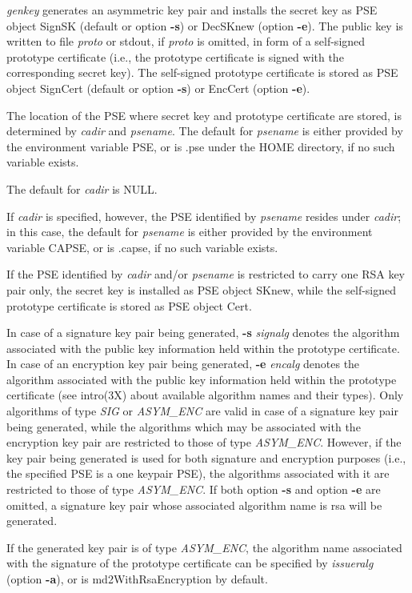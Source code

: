 {\em genkey} generates an asymmetric key pair and installs the secret key as PSE object
SignSK (default or option {\bf -s}) or DecSKnew (option {\bf -e}). The public key is written to file
{\em proto} or stdout, if {\em proto} is omitted, in form of a self-signed prototype certificate 
(i.e., the prototype certificate is signed with the corresponding secret key). 
The self-signed prototype certificate is stored as PSE object
SignCert (default or option {\bf -s}) or EncCert (option {\bf -e}).

The location of the PSE where secret key and prototype certificate are stored, is determined by 
{\em cadir} and {\em psename}. The default for {\em 
psename} is either provided by the environment variable PSE, or is .pse under the HOME directory, if no such
variable exists.
 
The default for {\em cadir} is NULL. 

If {\em cadir} is specified,
however, the PSE identified by {\em psename} resides under {\em cadir}; in this case, the default
for {\em psename} is either provided by the environment variable CAPSE, or is .capse, if no such variable
exists.

If the PSE identified by {\em cadir} and/or {\em psename} is restricted to carry one RSA key pair 
only, the secret
key is installed as PSE object SKnew, while the self-signed prototype certificate is stored as PSE object Cert.

In case of a signature key pair being generated, {\bf -s} {\em signalg}
denotes the algorithm associated with the public key information held within the prototype certificate.
In case of an encryption key pair being generated, {\bf -e} {\em encalg}
denotes the algorithm associated with the public key information held within the prototype certificate
(see intro(3X) about available algorithm names and their types).
Only algorithms of type {\em SIG} or {\em ASYM\_ENC} are valid in case of a signature key pair 
being generated, while the algorithms which may be associated with the encryption key pair 
are restricted to those of type {\em ASYM\_ENC}. 
However, if the key pair being generated is used for both signature and encryption purposes
(i.e., the specified PSE is a one keypair PSE), the algorithms associated with
it are restricted to those of type {\em ASYM\_ENC}.
If both option {\bf -s} and option {\bf -e} are omitted, a signature key pair whose
associated algorithm name is rsa will be generated. 

If the generated key pair is of type {\em ASYM\_ENC}, the algorithm name 
associated with the signature of the prototype certificate can be specified by {\em issueralg} 
(option {\bf -a}), or is md2WithRsaEncryption by default. 

